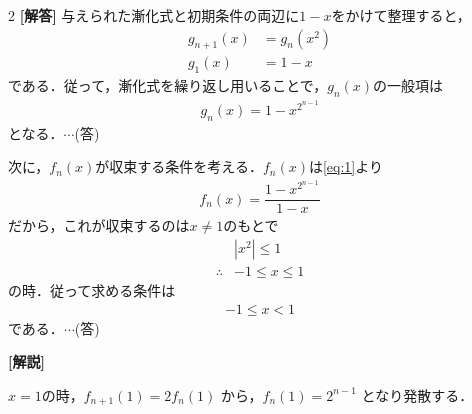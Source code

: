 \documentclass[../../main.tex]{subfiles}
\begin{document}
\setcounter{equation}{0}
\begin{oframed}
  
\end{oframed}
\setlength{\columnseprule}{0.4pt}
\begin{multicols}{2}
  {\bf [解答]}
  与えられた漸化式と初期条件の両辺に$1-x$をかけて整理すると，
  \begin{align}
    g_{n+1}(x) & =g_n(x^2) \\
    g_1(x)     & =1-x
  \end{align}
  である．従って，漸化式を繰り返し用いることで，$g_n(x)$の一般項は
  \begin{align}
    g_n(x)=1-x^{2^{n-1}} \label{eq:1}
  \end{align}
  となる．$\cdots$(答)

  次に，$f_n(x)$が収束する条件を考える．$f_n(x)$は\cref{eq:1}より
  \begin{align}
    f_n(x)=\dfrac{1-x^{2^{n-1}}}{1-x}
  \end{align}
  だから，これが収束するのは$x\neq 1$のもとで
  \begin{align}
    & |x^2| \le 1    \\
    \therefore
    & -1 \le x \le 1
  \end{align}
  の時．従って求める条件は
  \begin{align}
    -1 \le x < 1
  \end{align}
  である．$\cdots$(答)

  {\bf [解説]}

  $x=1$の時，$f_{n+1}(1)=2f_n(1)$ から，$f_n(1)=2^{n-1}$ となり発散する．

  \newpage
\end{multicols}
\end{document}
